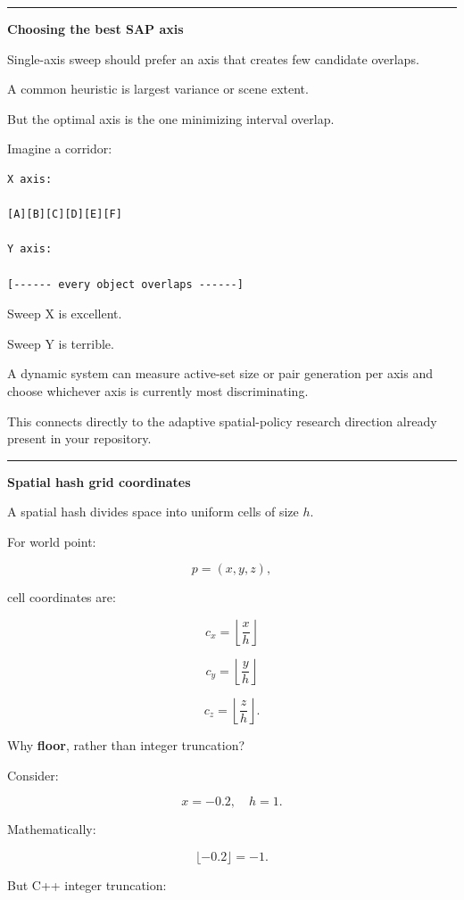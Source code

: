 \begin{center}\rule{0.5\linewidth}{0.5pt}\end{center}

\textbf{Choosing the best SAP axis}

Single-axis sweep should prefer an axis that creates few candidate overlaps.

A common heuristic is largest variance or scene extent.

But the optimal axis is the one minimizing interval overlap.

Imagine a corridor:

\begin{verbatim}
X axis:

[A][B][C][D][E][F]

Y axis:

[------ every object overlaps ------]
\end{verbatim}

Sweep X is excellent.

Sweep Y is terrible.

A dynamic system can measure active-set size or pair generation per axis and choose whichever axis is currently most discriminating.

This connects directly to the adaptive spatial-policy research direction already present in your repository.

\begin{center}\rule{0.5\linewidth}{0.5pt}\end{center}

\textbf{Spatial hash grid coordinates}

A spatial hash divides space into uniform cells of size \(h\).

For world point:

\[
p=(x,y,z),
\]

cell coordinates are:

\[
\boxed{
c_x=\left\lfloor\frac{x}{h}\right\rfloor
}
\]

\[
c_y=\left\lfloor\frac{y}{h}\right\rfloor
\]

\[
c_z=\left\lfloor\frac{z}{h}\right\rfloor.
\]

Why \textbf{floor}, rather than integer truncation?

Consider:

\[
x=-0.2,\quad h=1.
\]

Mathematically:

\[
\lfloor-0.2\rfloor=-1.
\]

But C++ integer truncation:

